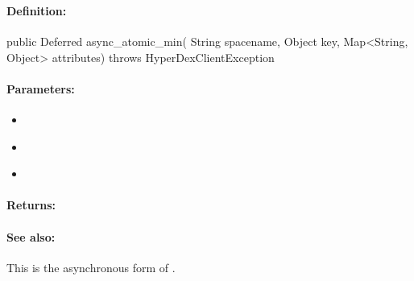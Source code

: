 \pagebreak
\subsubsection{}
\label{api:java:async_atomic_min}


\paragraph{Definition:}
\begin{javacode}
public Deferred async_atomic_min(
        String spacename,
        Object key,
        Map<String, Object> attributes) throws HyperDexClientException
\end{javacode}

\paragraph{Parameters:}
\begin{itemize}[noitemsep]
\item {}\\

\item {}\\

\item {}\\

\end{itemize}

\paragraph{Returns:}


\paragraph{See also:}  This is the asynchronous form of .

\pagebreak
\subsubsection{}
\label{api:java:cond_atomic_min}


